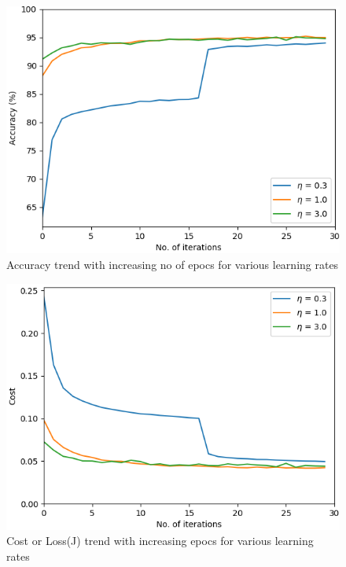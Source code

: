 \documentclass[conference]{IEEEtran}
\begin{document}
\begin{figure}[h]
	\centering
	\includegraphics[width=\linewidth]{multi_eta_accuracy}
	\caption{Accuracy trend with increasing no of epocs for various learning rates}
\end{figure}
\begin{figure}[h]
	\centering
	\includegraphics[width=\linewidth]{multi_eta_cost}
	\caption{Cost or Loss(J) trend with increasing epocs for various learning rates}
\end{figure}
\end{document}
